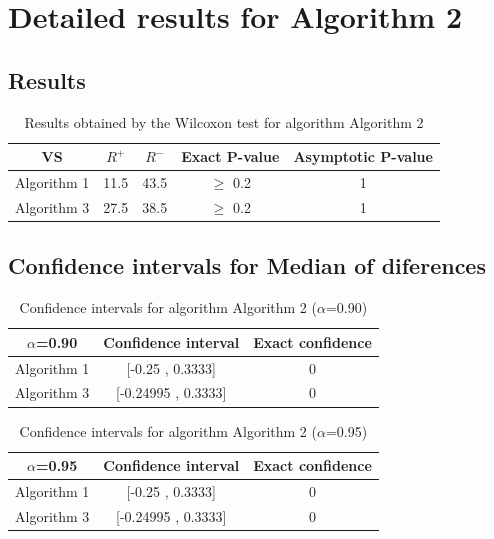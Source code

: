 \documentclass[a4paper,10pt]{article}
\begin{document}
 \clearpage 


\section{Detailed results for Algorithm 2}


\subsection{Results}

\begin{table}[!htp]
\centering\small
\begin{tabular}{
|c|c|c|c|c|}
\hline
 VS & $R^{+}$ & $R^{-}$ & Exact P-value & Asymptotic P-value \\ \hline 
Algorithm 1 & 11.5 & 43.5 & $\geq$ 0.2 & 1\\ \hline 
Algorithm 3 & 27.5 & 38.5 & $\geq$ 0.2 & 1\\ \hline 

\end{tabular}
\caption{Results obtained by the Wilcoxon test for algorithm Algorithm 2}
\end{table}

\subsection{Confidence intervals for Median of diferences}

\begin{table}[!htp]
\centering\small
\begin{tabular}{
|c|c|c|}
\hline
 $\alpha$=0.90 & Confidence interval & Exact confidence \\ \hline 
Algorithm 1 & [-0.25 , 0.3333] & 0\\ \hline 
Algorithm 3 & [-0.24995 , 0.3333] & 0\\ \hline 

\end{tabular}
\caption{Confidence intervals for algorithm Algorithm 2 ($\alpha$=0.90)}
\end{table}
\begin{table}[!htp]
\centering\small
\begin{tabular}{
|c|c|c|}
\hline
 $\alpha$=0.95 & Confidence interval & Exact confidence \\ \hline 
Algorithm 1 & [-0.25 , 0.3333] & 0\\ \hline 
Algorithm 3 & [-0.24995 , 0.3333] & 0\\ \hline 

\end{tabular}
\caption{Confidence intervals for algorithm Algorithm 2 ($\alpha$=0.95)}
\end{table}
\end{document}
